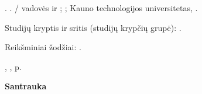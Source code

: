 \begin{titlepage}

\projectAuthorNameLT. \projectTitleLT. \projectTypeLT / vadovės \projectSupervisorNameFirstLT  ir \projectSupervisorNameSecondLT; ; Kauno technologijos universitetas, \projectFacultyLT.

Studijų kryptis ir sritis (studijų krypčių grupė): \projectStudyFieldAndAreaLT.

Reikšminiai žodžiai: \projectKeywordsLT.

\projectCity, \projectYear, \pageref{LastPage} p.


\begin{center}
  \textbf{Santrauka}
\end{center}

\lipsum[2-3]




\end{titlepage}

